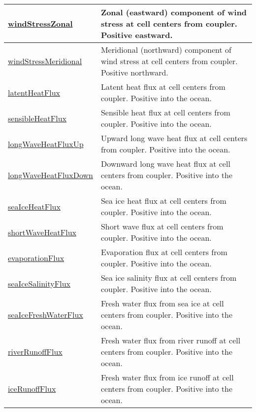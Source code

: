 {\begin{center}
\begin{longtable}{| p{2.0in} | p{4.0in} |}
	\hline
	\hyperref[subsec:var_sec_forcing_windStressZonal]{windStressZonal} & Zonal (eastward) component of wind stress at cell centers from coupler. Positive eastward. \\
	\hline
	\hyperref[subsec:var_sec_forcing_windStressMeridional]{windStressMeridional} & Meridional (northward) component of wind stress at cell centers from coupler. Positive northward. \\
	\hline
	\hyperref[subsec:var_sec_forcing_latentHeatFlux]{latentHeatFlux} & Latent heat flux at cell centers from coupler. Positive into the ocean. \\
	\hline
	\hyperref[subsec:var_sec_forcing_sensibleHeatFlux]{sensibleHeatFlux} & Sensible heat flux at cell centers from coupler. Positive into the ocean. \\
	\hline
	\hyperref[subsec:var_sec_forcing_longWaveHeatFluxUp]{longWaveHeatFluxUp} & Upward long wave heat flux at cell centers from coupler. Positive into the ocean. \\
	\hline
	\hyperref[subsec:var_sec_forcing_longWaveHeatFluxDown]{longWaveHeatFluxDown} & Downward long wave heat flux at cell centers from coupler. Positive into the ocean. \\
	\hline
	\hyperref[subsec:var_sec_forcing_seaIceHeatFlux]{seaIceHeatFlux} & Sea ice heat flux at cell centers from coupler. Positive into the ocean. \\
	\hline
	\hyperref[subsec:var_sec_forcing_shortWaveHeatFlux]{shortWaveHeatFlux} & Short wave flux at cell centers from coupler. Positive into the ocean. \\
	\hline
	\hyperref[subsec:var_sec_forcing_evaporationFlux]{evaporationFlux} & Evaporation flux at cell centers from coupler. Positive into the ocean. \\
	\hline
	\hyperref[subsec:var_sec_forcing_seaIceSalinityFlux]{seaIceSalinityFlux} & Sea ice salinity flux at cell centers from coupler. Positive into the ocean. \\
	\hline
	\hyperref[subsec:var_sec_forcing_seaIceFreshWaterFlux]{seaIceFreshWaterFlux} & Fresh water flux from sea ice at cell centers from coupler. Positive into the ocean. \\
	\hline
	\hyperref[subsec:var_sec_forcing_riverRunoffFlux]{riverRunoffFlux} & Fresh water flux from river runoff at cell centers from coupler. Positive into the ocean. \\
	\hline
	\hyperref[subsec:var_sec_forcing_iceRunoffFlux]{iceRunoffFlux} & Fresh water flux from ice runoff at cell centers from coupler. Positive into the ocean. \\

\end{longtable}
\end{center}}
